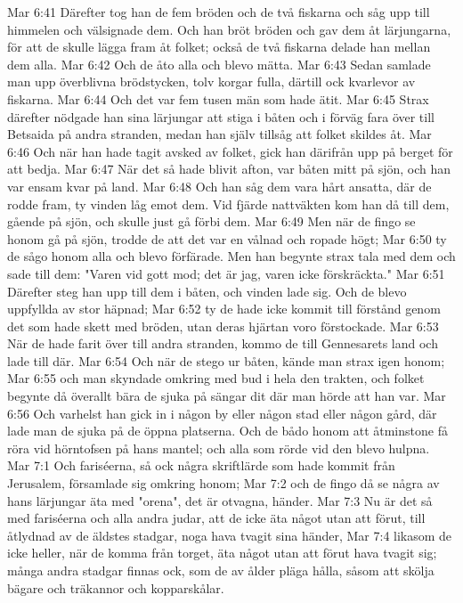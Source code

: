 Mar 6:41  Därefter tog han de fem bröden och de två fiskarna och såg upp till himmelen och välsignade dem. Och han bröt bröden och gav dem åt lärjungarna, för att de skulle lägga fram åt folket; också de två fiskarna delade han mellan dem alla.
Mar 6:42  Och de åto alla och blevo mätta.
Mar 6:43  Sedan samlade man upp överblivna brödstycken, tolv korgar fulla, därtill ock kvarlevor av fiskarna.
Mar 6:44  Och det var fem tusen män som hade ätit.
Mar 6:45  Strax därefter nödgade han sina lärjungar att stiga i båten och i förväg fara över till Betsaida på andra stranden, medan han själv tillsåg att folket skildes åt.
Mar 6:46  Och när han hade tagit avsked av folket, gick han därifrån upp på berget för att bedja.
Mar 6:47  När det så hade blivit afton, var båten mitt på sjön, och han var ensam kvar på land.
Mar 6:48  Och han såg dem vara hårt ansatta, där de rodde fram, ty vinden låg emot dem. Vid fjärde nattväkten kom han då till dem, gående på sjön, och skulle just gå förbi dem.
Mar 6:49  Men när de fingo se honom gå på sjön, trodde de att det var en vålnad och ropade högt;
Mar 6:50  ty de sågo honom alla och blevo förfärade. Men han begynte strax tala med dem och sade till dem: "Varen vid gott mod; det är jag, varen icke förskräckta."
Mar 6:51  Därefter steg han upp till dem i båten, och vinden lade sig. Och de blevo uppfyllda av stor häpnad;
Mar 6:52  ty de hade icke kommit till förstånd genom det som hade skett med bröden, utan deras hjärtan voro förstockade.
Mar 6:53  När de hade farit över till andra stranden, kommo de till Gennesarets land och lade till där.
Mar 6:54  Och när de stego ur båten, kände man strax igen honom;
Mar 6:55  och man skyndade omkring med bud i hela den trakten, och folket begynte då överallt bära de sjuka på sängar dit där man hörde att han var.
Mar 6:56  Och varhelst han gick in i någon by eller någon stad eller någon gård, där lade man de sjuka på de öppna platserna. Och de bådo honom att åtminstone få röra vid hörntofsen på hans mantel; och alla som rörde vid den blevo hulpna.
Mar 7:1  Och fariséerna, så ock några skriftlärde som hade kommit från Jerusalem, församlade sig omkring honom;
Mar 7:2  och de fingo då se några av hans lärjungar äta med "orena", det är otvagna, händer.
Mar 7:3  Nu är det så med fariséerna och alla andra judar, att de icke äta något utan att förut, till åtlydnad av de äldstes stadgar, noga hava tvagit sina händer,
Mar 7:4  likasom de icke heller, när de komma från torget, äta något utan att förut hava tvagit sig; många andra stadgar finnas ock, som de av ålder pläga hålla, såsom att skölja bägare och träkannor och kopparskålar.
